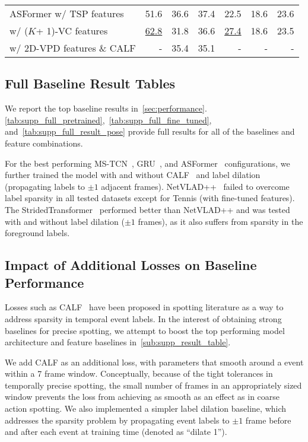 \documentclass[runningheads]{llncs}
\newcommand{\notation}[1]{\ensuremath{#1}\xspace}
\newcommand{\NumClasses}{\notation{K}}
\newcommand{\best}[1]{\underline{#1}}
\begin{document}
\begin{table*}[p]
{\begin{tabularx}{\textwidth}{lrrrrrr}
        ASFormer w/ TSP features
            & 51.6
            & 36.6
            & 37.4
            & 22.5
            & 18.6 & 23.6 \\
        \hspace{4.4em} w/ (\NumClasses + 1)-VC features
            & \best{62.8}
            & 31.8
            & 36.6
            & \best{27.4}
            & 18.6 & 23.5 \\
        \hspace{4.4em} w/ 2D-VPD features \& CALF
            & - & 35.4 & 35.1 & - & - & - \\
        \bottomrule
    \end{tabularx}
    }
\end{table*} 
\subsection{Full Baseline Result Tables}
\label{sub:supp_result_table}

We report the top baseline results in~\autoref{sec:performance}.
\autoref{tab:supp_full_pretrained},~\ref{tab:supp_full_fine_tuned}, and~\ref{tab:supp_full_result_pose} provide full results for all of the baselines and feature combinations.

For the best performing MS-TCN~\cite{mstcn}, GRU~\cite{gatedrnn}, and ASFormer~\cite{asformer} configurations, we further trained the model with and without CALF~\cite{calf} and label dilation (propagating labels to $\pm 1$ adjacent frames).
NetVLAD++~\cite{netvladpp} failed to overcome label sparsity in all tested datasets except for Tennis (with fine-tuned features).
The StridedTransformer~\cite{pytorchtransformer} performed better than NetVLAD++ and was tested with and without label dilation ($\pm 1$ frames), as it also suffers from sparsity in the foreground labels.

\subsection{Impact of Additional Losses on Baseline Performance}
\label{sub:supp_calf_and_dilate}

Losses such as CALF~\cite{calf} have been proposed in spotting literature as a way to address sparsity in temporal event labels.
In the interest of obtaining strong baselines for precise spotting, we attempt to boost the top performing model architecture and feature baselines in~\autoref{sub:supp_result_table}.

We add CALF as an additional loss, with parameters that smooth around a event within a 7 frame window.
Conceptually, because of the tight tolerances in temporally precise spotting, the small number of frames in an appropriately sized window prevents the loss from achieving as smooth as an effect as in coarse action spotting.
We also implemented a simpler label dilation baseline, which addresses the sparsity problem by propagating event labels to $\pm 1$ frame before and after each event at training time (denoted as ``dilate 1'').
\end{document}
